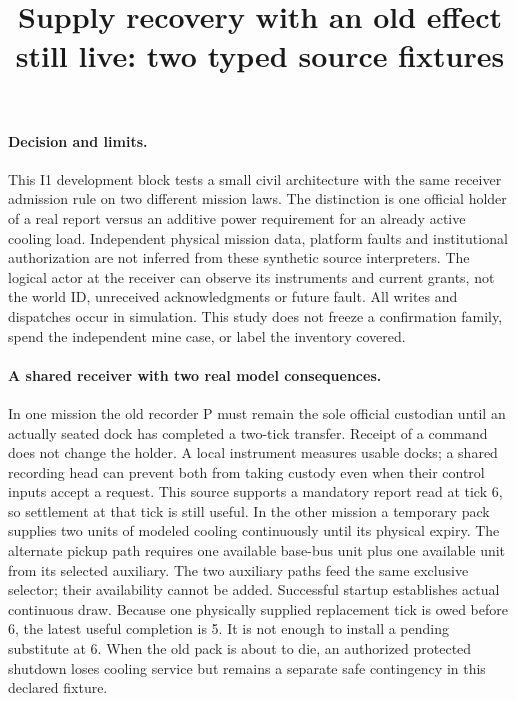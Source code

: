 \documentclass{article}
\title{Supply recovery with an old effect still live: two typed source fixtures}
\date{}
\begin{document}
\maketitle

\paragraph{Decision and limits.}
This I1 development block tests a small civil architecture with the same receiver admission rule on two different mission laws. The distinction is one official holder of a real report versus an additive power requirement for an already active cooling load. Independent physical mission data, platform faults and institutional authorization are not inferred from these synthetic source interpreters. The logical actor at the receiver can observe its instruments and current grants, not the world ID, unreceived acknowledgments or future fault. All writes and dispatches occur in simulation. This study does not freeze a confirmation family, spend the independent mine case, or label the inventory covered.

\paragraph{A shared receiver with two real model consequences.}
In one mission the old recorder P must remain the sole official custodian until an actually seated dock has completed a two-tick transfer. Receipt of a command does not change the holder. A local instrument measures usable docks; a shared recording head can prevent both from taking custody even when their control inputs accept a request. This source supports a mandatory report read at tick 6, so settlement at that tick is still useful. In the other mission a temporary pack supplies two units of modeled cooling continuously until its physical expiry. The alternate pickup path requires one available base-bus unit plus one available unit from its selected auxiliary. The two auxiliary paths feed the same exclusive selector; their availability cannot be added. Successful startup establishes actual continuous draw. Because one physically supplied replacement tick is owed before 6, the latest useful completion is 5. It is not enough to install a pending substitute at 6. When the old pack is about to die, an authorized protected shutdown loses cooling service but remains a separate safe contingency in this declared fixture.
\end{document}
